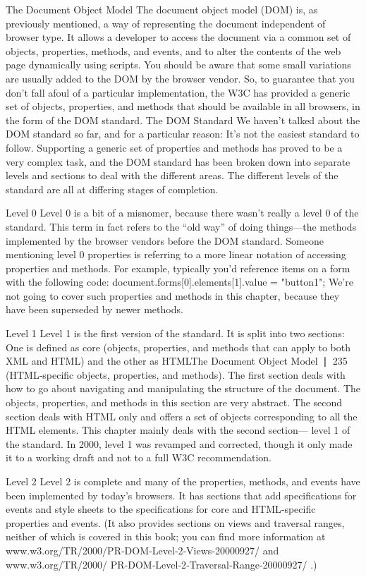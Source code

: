 The Document Object Model
The document object model (DOM) is, as previously mentioned, a way of representing the document
independent of browser type. It allows a developer to access the document via a common set of objects,
properties, methods, and events, and to alter the contents of the web page dynamically using scripts.
You should be aware that some small variations are usually added to the DOM by the browser
vendor. So, to guarantee that you don’t fall afoul of a particular implementation, the W3C has
provided a generic set of objects, properties, and methods that should be available in all browsers, in
the form of the DOM standard.
The DOM Standard
We haven’t talked about the DOM standard so far, and for a particular reason: It’s not the easiest
standard to follow. Supporting a generic set of properties and methods has proved to be a very
complex task, and the DOM standard has been broken down into separate levels and sections
to deal with the different areas. The different levels of the standard are all at differing stages of
completion.

Level 0
Level 0 is a bit of a misnomer, because there wasn’t really a level 0 of the standard. This term in fact
refers to the “old way” of doing things—the methods implemented by the browser vendors before the
DOM standard. Someone mentioning level 0 properties is referring to a more linear notation of accessing
properties and methods. For example, typically you’d reference items on a form with the following code:
document.forms[0].elements[1].value = "button1";
We’re not going to cover such properties and methods in this chapter, because they have been
superseded by newer methods.

Level 1
Level 1 is the first version of the standard. It is split into two sections: One is defined as core
(objects, properties, and methods that can apply to both XML and HTML) and the other as HTMLThe Document Object Model
❘ 235
(HTML‐specific objects, properties, and methods). The first section deals with how to go about
navigating and manipulating the structure of the document. The objects, properties, and methods in
this section are very abstract. The second section deals with HTML only and offers a set of objects
corresponding to all the HTML elements. This chapter mainly deals with the second section—
level 1 of the standard.
In 2000, level 1 was revamped and corrected, though it only made it to a working draft and not to a
full W3C recommendation.

Level 2
Level 2 is complete and many of the properties, methods, and events have been implemented
by today’s browsers. It has sections that add specifications for events and style sheets to the
specifications for core and HTML‐specific properties and events. (It also provides sections on
views and traversal ranges, neither of which is covered in this book; you can find more information
at www.w3.org/TR/2000/PR‐DOM‐Level‐2‐Views‐20000927/ and www.w3.org/TR/2000/
PR‐DOM‐Level‐2‐Traversal‐Range‐20000927/ .)

